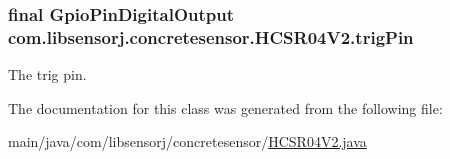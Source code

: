 \subsubsection[{trig\+Pin}]{\setlength{\rightskip}{0pt plus 5cm}final Gpio\+Pin\+Digital\+Output com.\+libsensorj.\+concretesensor.\+H\+C\+S\+R04\+V2.\+trig\+Pin\hspace{0.3cm}{\ttfamily [private]}}\label{classcom_1_1libsensorj_1_1concretesensor_1_1HCSR04V2_af997fea7e3e027fdb73884169208104d}
The trig pin. 

The documentation for this class was generated from the following file\+:\begin{DoxyCompactItemize}
\item 
main/java/com/libsensorj/concretesensor/\hyperlink{HCSR04V2_8java}{H\+C\+S\+R04\+V2.\+java}\end{DoxyCompactItemize}
